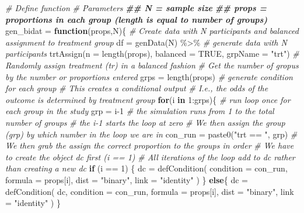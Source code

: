 \documentclass[
]{book}
\newenvironment{Shaded}{\begin{snugshade}}{\end{snugshade}}
\newcommand{\AttributeTok}[1]{\textcolor[rgb]{0.77,0.63,0.00}{#1}}
\newcommand{\CommentTok}[1]{\textcolor[rgb]{0.56,0.35,0.01}{\textit{#1}}}
\newcommand{\ConstantTok}[1]{\textcolor[rgb]{0.00,0.00,0.00}{#1}}
\newcommand{\ControlFlowTok}[1]{\textcolor[rgb]{0.13,0.29,0.53}{\textbf{#1}}}
\newcommand{\DecValTok}[1]{\textcolor[rgb]{0.00,0.00,0.81}{#1}}
\newcommand{\DocumentationTok}[1]{\textcolor[rgb]{0.56,0.35,0.01}{\textbf{\textit{#1}}}}
\newcommand{\FunctionTok}[1]{\textcolor[rgb]{0.00,0.00,0.00}{#1}}
\newcommand{\NormalTok}[1]{#1}
\newcommand{\OtherTok}[1]{\textcolor[rgb]{0.56,0.35,0.01}{#1}}
\newcommand{\SpecialCharTok}[1]{\textcolor[rgb]{0.00,0.00,0.00}{#1}}
\newcommand{\StringTok}[1]{\textcolor[rgb]{0.31,0.60,0.02}{#1}}
\begin{document}
\begin{Shaded}
\begin{Highlighting}[]
\CommentTok{\# Define function}
\CommentTok{\# Parameters}
\DocumentationTok{\#\# N = sample size}
\DocumentationTok{\#\# props = proportions in each group (length is equal to number of groups)}
\NormalTok{gen\_bidat }\OtherTok{=} \ControlFlowTok{function}\NormalTok{(props,N)\{}
  \CommentTok{\# Create data with N participants and balanced assignment to treatment group}
\NormalTok{  df }\OtherTok{=} \FunctionTok{genData}\NormalTok{(N) }\SpecialCharTok{\%\textgreater{}\%} \CommentTok{\# generate data with N participants}
    \FunctionTok{trtAssign}\NormalTok{(}\AttributeTok{n =} \FunctionTok{length}\NormalTok{(props),}
              \AttributeTok{balanced =} \ConstantTok{TRUE}\NormalTok{,}
              \AttributeTok{grpName =} \StringTok{"trt"}\NormalTok{) }\CommentTok{\# Randomly assign treatment (tr) in a balanced fashion  }
  \CommentTok{\# Get the number of gropus by the number or proportions entered}
\NormalTok{  grps }\OtherTok{=} \FunctionTok{length}\NormalTok{(props)}
  \CommentTok{\# generate condition for each group}
  \CommentTok{\# This creates a conditional output }
  \CommentTok{\# I.e., the odds of the outcome is determined by treatment group}
  \ControlFlowTok{for}\NormalTok{(i }\ControlFlowTok{in} \DecValTok{1}\SpecialCharTok{:}\NormalTok{grps)\{ }\CommentTok{\# run loop once for each group in the study}
\NormalTok{    grp }\OtherTok{=}\NormalTok{ i}\DecValTok{{-}1} \CommentTok{\# the simulation runs from 1 to the total number of groups}
    \CommentTok{\# the i{-}1 starts the loop at zero}
    \CommentTok{\# We then assign the group (grp) by which number in the loop we are in}
\NormalTok{    con\_run }\OtherTok{=} \FunctionTok{paste0}\NormalTok{(}\StringTok{"trt == "}\NormalTok{, grp)}
    \CommentTok{\# We then grab the assign the correct proportion to the groups in order}
    \CommentTok{\# We have to create the object dc first (i == 1)}
    \CommentTok{\# All iterations of the loop add to dc rather than creating a new dc}
    \ControlFlowTok{if}\NormalTok{ (i }\SpecialCharTok{==} \DecValTok{1}\NormalTok{) \{}
\NormalTok{      dc }\OtherTok{=} \FunctionTok{defCondition}\NormalTok{(}
        \AttributeTok{condition =}\NormalTok{ con\_run,}
        \AttributeTok{formula =}\NormalTok{ props[i],}
        \AttributeTok{dist =} \StringTok{"binary"}\NormalTok{,}
        \AttributeTok{link =} \StringTok{"identity"}
\NormalTok{      )}
\NormalTok{    \} }\ControlFlowTok{else}\NormalTok{\{}
\NormalTok{      dc }\OtherTok{=} \FunctionTok{defCondition}\NormalTok{(}
\NormalTok{        dc,}
        \AttributeTok{condition =}\NormalTok{ con\_run,}
        \AttributeTok{formula =}\NormalTok{ props[i],}
        \AttributeTok{dist =} \StringTok{"binary"}\NormalTok{,}
        \AttributeTok{link =} \StringTok{"identity"}
\NormalTok{      )}
\NormalTok{    \}}
    

\end{Highlighting}
\end{Shaded}
\end{document}
